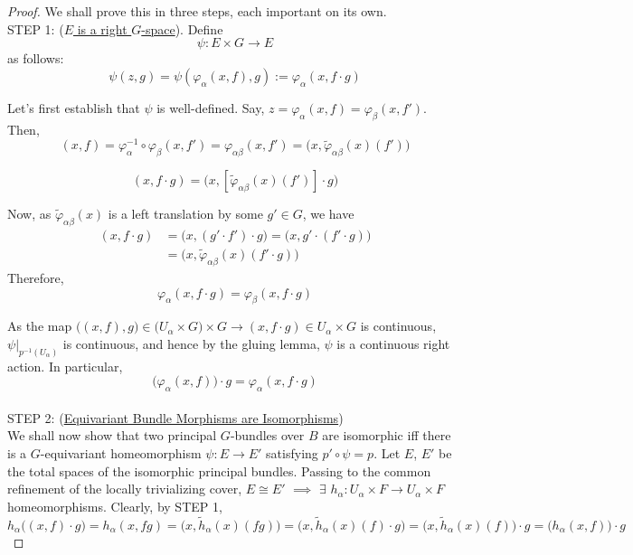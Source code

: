 \documentclass[11pt,a4paper]{article}
\begin{document}
\begin{proof}
We shall prove this in three steps, each important on its own.\\


STEP 1: (\underline{$E$ is a right $G$-space}). Define
$$\psi: E\times G \rightarrow E$$
as follows:
$$\psi(z, g) = \psi(\varphi_{\alpha}(x,f), g):= \varphi_{\alpha}(x, f\cdot g)$$


Let's first establish that $\psi$ is well-defined. Say, $z = \varphi_{\alpha}(x, f) = \varphi_{\beta}(x, f')$. Then,\\
$$(x, f) = \varphi_{\alpha}^{-1}\circ\varphi_{\beta}(x, f') = \varphi_{\alpha\beta}(x, f') = \big(x, \widetilde{\varphi}_{\alpha\beta}(x)(f')\big)$$

$$(x, f\cdot g) = \big(x, [\widetilde{\varphi}_{\alpha\beta}(x)(f')]\cdot g\big)$$


Now, as $\widetilde{\varphi}_{\alpha\beta}(x)$ is a left translation by some $g' \in G$, we have
\begin{equation*}
\begin{split}
(x, f\cdot g) & = \big(x, (g'\cdot f')\cdot g\big) = \big(x, g'\cdot (f'\cdot g)\big) \\
 & = \big(x, \widetilde{\varphi}_{\alpha\beta}(x)(f'\cdot g)\big)
\end{split}
\end{equation*}
Therefore,
$$\varphi_{\alpha}(x, f\cdot g) = \varphi_{\beta}(x, f\cdot g)$$


As the map $\big((x, f), g\big) \in \big(U_{\alpha}\times G\big)\times G \longrightarrow (x, f\cdot g) \in U_{\alpha}\times G$ is continuous, $\psi\big|_{p^{-1}(U_{\alpha})}$ is continuous, and hence by the gluing lemma, $\psi$ is a continuous right action. In particular, $$\big(\varphi_{\alpha}(x, f)\big)\cdot g = \varphi_{\alpha}(x, f\cdot g)$$  \\
STEP 2: (\underline{Equivariant Bundle Morphisms are Isomorphisms})\\


We shall now show that two principal $G$-bundles over $B$ are isomorphic iff there is a $G$-equivariant homeomorphism $\psi:E\to E'$ satisfying $p'\circ\psi=p$. Let $E$, $E'$ be the total spaces of the isomorphic principal bundles. Passing to the common refinement of the locally trivializing cover, $E \cong E'$ $\implies$ $\exists$ $h_{\alpha}: U_{\alpha}\times F \rightarrow U_{\alpha}\times F$ homeomorphisms. Clearly, by STEP 1,
$$h_{\alpha}\big((x, f)\cdot g\big) = h_{\alpha}(x, fg) = \big(x, \widetilde{h}_{\alpha}(x)(fg)\big) = \big(x, \widetilde{h}_{\alpha}(x)(f)\cdot g\big) = \big(x, \widetilde{h}_{\alpha}(x)(f)\big)\cdot g = \big(h_{\alpha}(x, f)\big)\cdot g$$


\end{proof}
\end{document}
